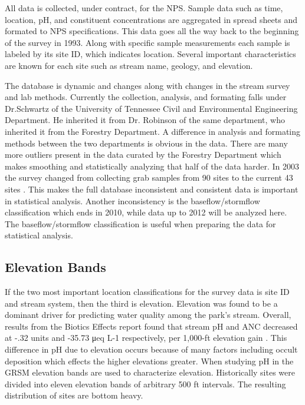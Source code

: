 All data is collected, under contract, for the NPS.
Sample data such as time, location, pH, and constituent concentrations are aggregated in spread sheets and formated to NPS specifications.
This data goes all the way back to the beginning of the survey in 1993.
Along with specific sample measurements each sample is labeled by its site ID, which indicates location.
Several important characteristics are known for each site such as stream name, geology, and elevation.

The database is dynamic and changes along with changes in the stream survey and lab methods.
Currently the collection, analysis, and formating falls under Dr.Schwartz of the University of Tennessee Civil and Environmental Engineering Department.
He inherited it from Dr. Robinson of the same department, who inherited it from the Forestry Department.
A difference in analysis and formating methods between the two departments is obvious in the data.
There are many more outliers present in the data curated by the Forestry Department which makes smoothing and statistically analyzing that half of the data harder.
In 2003 the survey changed from collecting grab samples from 90 sites to the current 43 sites \citep{odom2003}.
This makes the full database inconsistent and consistent data is important in statistical analysis.
Another inconsistency is the baseflow/stormflow classification which ends in 2010, while data up to 2012 will be analyzed here.
The baseflow/stormflow classification is useful when preparing the data for statistical analysis.

\subsection{Elevation Bands}

If the two most important location classifications for the survey data is site ID and stream system, then the third is elevation.
Elevation was found to be a dominant driver for predicting water quality among the park’s stream.  
Overall, results from the Biotics Effects report found that stream pH and ANC decreased at -.32 units and -35.73 μeq L-1 respectively, per 1,000-ft elevation gain \citep{cai2013}. 
This difference in pH due to elevation occurs because of many factors including occult deposition which effects the higher elevations greater.
When studying pH in the GRSM elevation bands are used to characterize elevation.
Historically sites were divided into eleven elevation bands of arbitrary 500 ft intervals.
The resulting distribution of sites are bottom heavy.

